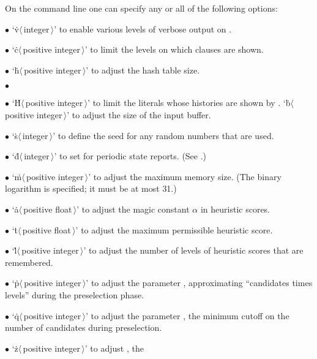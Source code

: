 On the command line one can specify any or all of the
following options:
\smallskip
\item{$\bullet$}
`\.v$\langle\,$integer$\,\rangle$' to enable various levels of verbose
output on .
\item{$\bullet$}
`\.c$\langle\,$positive integer$\,\rangle$' to limit the levels on which
clauses are shown.
\item{$\bullet$}
`\.h$\langle\,$positive integer$\,\rangle$' to adjust the hash table size.
\item{$\bullet$}
\item{$\bullet$}
`\.H$\langle\,$positive integer$\,\rangle$' to limit the literals whose
histories are shown by .
`\.b$\langle\,$positive integer$\,\rangle$' to adjust the size of the input
buffer.
\item{$\bullet$}
`\.s$\langle\,$integer$\,\rangle$' to define the seed for any random numbers
that are used.
\item{$\bullet$}
`\.d$\langle\,$integer$\,\rangle$' to set  for periodic state
reports.
(See .)
\item{$\bullet$}
`\.m$\langle\,$positive integer$\,\rangle$' to adjust the maximum memory size.
(The binary logarithm is specified; it must be at most 31.)
\item{$\bullet$}
`\.a$\langle\,$positive float$\,\rangle$' to adjust the magic constant
$\alpha$ in heuristic scores.
\item{$\bullet$}
`\.t$\langle\,$positive float$\,\rangle$' to adjust the maximum permissible
heuristic score.
\item{$\bullet$}
`\.l$\langle\,$positive integer$\,\rangle$' to adjust the number of levels
of heuristic scores that are remembered.
\item{$\bullet$}
`\.p$\langle\,$positive integer$\,\rangle$' to adjust the parameter
, approximating ``candidates times levels'' during the
preselection phase.
\item{$\bullet$}
`\.q$\langle\,$positive integer$\,\rangle$' to adjust the parameter
, the minimum cutoff on the number of candidates during
preselection.
\item{$\bullet$}
`\.z$\langle\,$positive integer$\,\rangle$' to adjust , the
